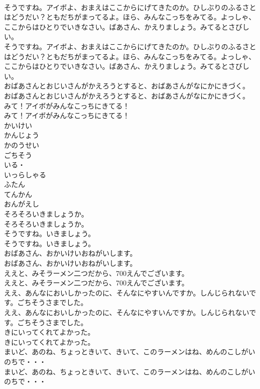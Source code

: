 \documentclass[8pt]{extreport}
\begin{document}
\begin{CJK}{UTF8}{min}
\\	そうですね。アイボよ、おまえはここからにげてきたのか。ひしぶりのふるさとはどうだい？ともだちがまってるよ。ほら、みんなこっちをみてる。よっしゃ、ここからはひとりでいきなさい。ばあさん、かえりましょう。みてるとさびしい。
\\	そうですね。アイボよ、おまえはここからにげてきたのか。ひしぶりのふるさとはどうだい？ともだちがまってるよ。ほら、みんなこっちをみてる。よっしゃ、ここからはひとりでいきなさい。ばあさん、かえりましょう。みてるとさびしい。
\\	おばあさんとおじいさんがかえろうとすると、おばあさんがなにかにきづく。
\\	おばあさんとおじいさんがかえろうとすると、おばあさんがなにかにきづく。
\\	みて！アイボがみんなこっちにきてる！
\\	みて！アイボがみんなこっちにきてる！
\\	かいけい
\\	かんじょう
\\	かのうせい
\\	ごちそう
\\	いる・
\\	いっらしゃる
\\	ふたん
\\	てんかん
\\	おんがえし
\\	そろそろいきましょうか。
\\	そろそろいきましょうか。
\\	そうですね。いきましょう。
\\	そうですね。いきましょう。
\\	おばあさん、おかいけいおねがいします。
\\	おばあさん、おかいけいおねがいします。
\\	ええと、みそラーメン二つだから、700えんでございます。
\\	ええと、みそラーメン二つだから、700えんでございます。
\\	ええ、あんなにおいしかったのに、そんなにやすいんですか。しんじられないです。ごちそうさまでした。
\\	ええ、あんなにおいしかったのに、そんなにやすいんですか。しんじられないです。ごちそうさまでした。
\\	きにいってくれてよかった。
\\	きにいってくれてよかった。
\\	まいど、あのね、ちょっときいて、きいて、このラーメンはね、めんのこしがいのちで・・・
\\	まいど、あのね、ちょっときいて、きいて、このラーメンはね、めんのこしがいのちで・・・

\end{CJK}
\end{document}

